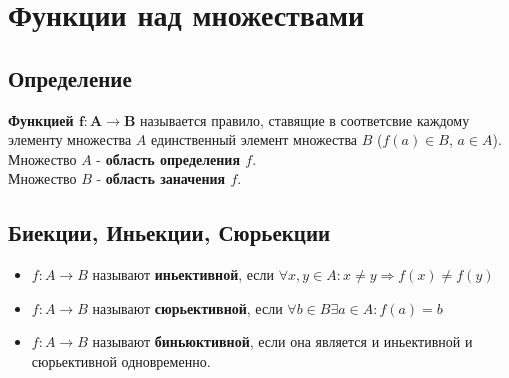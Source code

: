           
\chapter{Функции над множествами}
\section{Определение}
\textbf{Функцией $\mathbf{f : A \rightarrow B}$} называется правило, ставящие в соответсвие каждому элементу множества $A$ единственный элемент множества $B$ ($f(a) \in B$, $a \in A$).\\
Множество $A$ - \textbf{область определения $f$}.\\
Множество $B$ - \textbf{область заначения $f$}.\\
\section{Биекции, Иньекции, Сюрьекции}
\begin{itemize}
	\item $f : A \rightarrow B$ называют \textbf{иньективной}, если $\forall x, y \in A : x \neq y \Rightarrow f(x) \neq f(y)$
	\item $f : A \rightarrow B$ называют \textbf{сюрьективной}, если $\forall b \in B \exists a \in A : f(a) = b$
	\item $f : A \rightarrow B$ называют \textbf{биньюктивной}, если она является и иньективной и сюрьективной одновременно. 
\end{itemize}
